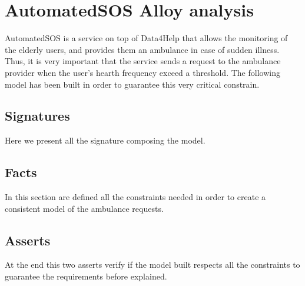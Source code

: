 \section{AutomatedSOS Alloy analysis}

    AutomatedSOS is a service on top of Data4Help that allows the monitoring of the elderly users, and provides them an ambulance in case of sudden illness. Thus, it is very important that the service sends a request to the ambulance provider when the user's hearth frequency exceed a threshold. The following model has been built in order to guarantee this very critical constrain.
    
    \subsection{Signatures}
        
        Here we present all the signature composing the model.
        
        
    
    \subsection{Facts}
 
        In this section are defined all the constraints needed in order to create a consistent model of the ambulance requests.
    
        

    \subsection{Asserts}
    
        At the end this two asserts verify if the model built respects all the constraints to guarantee the requirements before explained.
    
        